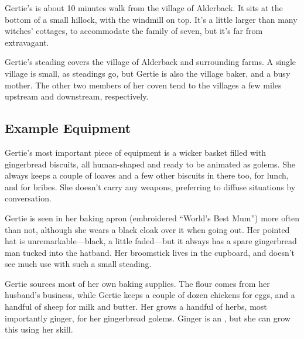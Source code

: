 Gertie's {\cottage} is about 10 minutes walk from the village of Alderback.
It sits at the bottom of a small hillock, with the windmill on top.
It's a little larger than many witches' cottages, to accommodate the family of seven, but it's far from extravagant.

Gertie's steading covers the village of Alderback and surrounding farms.
A single village is small, as steadings go, but Gertie is also the village baker, and a busy mother.
The other two members of her coven tend to the villages a few miles upstream and downstream, respectively.

\subsection{Example Equipment}

Gertie's most important piece of equipment is a wicker basket filled with gingerbread biscuits, all human-shaped and ready to be animated as golems.
She always keeps a couple of loaves and a few other biscuits in there too, for lunch, and for bribes.
She doesn't carry any weapons, preferring to diffuse situations by conversation.

Gertie is seen in her baking apron (embroidered ``World's Best Mum'') more often than not, although she wears a black cloak over it when going out.
Her pointed hat is unremarkable---black, a little faded---but it always has a spare gingerbread man tucked into the hatband.
Her broomstick lives in the cupboard, and doesn't see much use with such a small steading.

Gertie sources most of her own baking supplies.
The flour comes from her husband's business, while Gertie keeps a couple of dozen chickens for eggs, and a handful of sheep for milk and butter.
Her {\garden} grows a handful of herbs, most importantly ginger, for her gingerbread golems.
Ginger is an , but she can grow this using her  skill.

